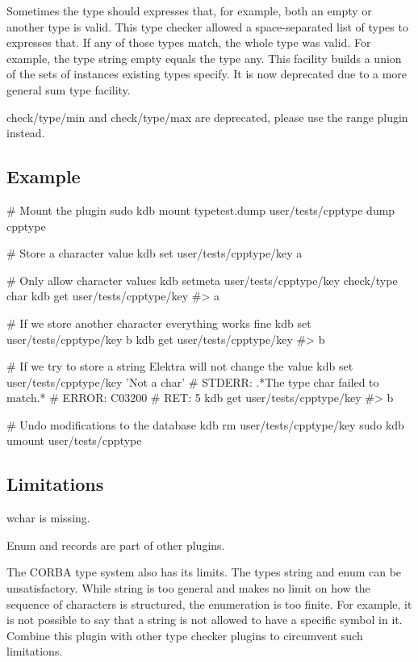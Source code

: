Sometimes the type should expresses that, for example, both an empty or another type is valid. This type checker allowed a space-\/separated list of types to expresses that. If any of those types match, the whole type was valid. For example, the type {\ttfamily string empty} equals the type {\ttfamily any}. This facility builds a union of the sets of instances existing types specify. It is now deprecated due to a more general sum type facility.

{\ttfamily check/type/min} and {\ttfamily check/type/max} are deprecated, please use the range plugin instead.

\subsection*{Example}


\begin{DoxyCode}
# Mount the plugin
sudo kdb mount typetest.dump user/tests/cpptype dump cpptype

# Store a character value
kdb set user/tests/cpptype/key a

# Only allow character values
kdb setmeta user/tests/cpptype/key check/type char
kdb get user/tests/cpptype/key
#> a

# If we store another character everything works fine
kdb set user/tests/cpptype/key b
kdb get user/tests/cpptype/key
#> b

# If we try to store a string Elektra will not change the value
kdb set user/tests/cpptype/key 'Not a char'
# STDERR: .*The type char failed to match.*
# ERROR:  C03200
# RET:    5
kdb get user/tests/cpptype/key
#> b

# Undo modifications to the database
kdb rm user/tests/cpptype/key
sudo kdb umount user/tests/cpptype
\end{DoxyCode}


\subsection*{Limitations}

{\ttfamily wchar} is missing.

Enum and records are part of other plugins.

The {\ttfamily C\+O\+R\+BA} type system also has its limits. The types {\ttfamily string} and {\ttfamily enum} can be unsatisfactory. While string is too general and makes no limit on how the sequence of characters is structured, the enumeration is too finite. For example, it is not possible to say that a string is not allowed to have a specific symbol in it. Combine this plugin with other type checker plugins to circumvent such limitations. 